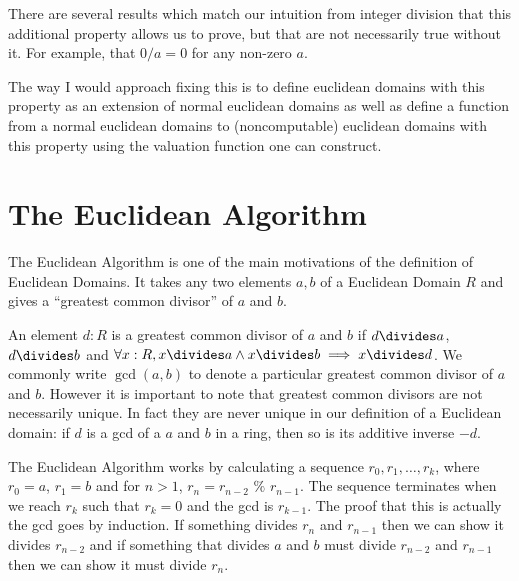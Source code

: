 \documentclass{article}
\begin{document}
There are several results which match our intuition from integer division that this additional property allows us to prove, but that are not necessarily true without it.
For example, that $0/a=0$ for any non-zero $a$.

The way I would approach fixing this is to define euclidean domains with this property as an extension of normal euclidean domains as well as define a function from a normal euclidean domains to (noncomputable) euclidean domains with this property using the valuation function one can construct.



\section{The Euclidean Algorithm}

The Euclidean Algorithm is one of the main motivations of the definition of Euclidean Domains. 
It takes any two elements $a,b$ of a Euclidean Domain $R$ and gives a ``greatest common divisor'' of $a$ and $b$. 

An element $d : R$ is a greatest common divisor of $a$ and $b$ if $d \divides a$, $d \divides b$ and $\forall x : R, x \divides a \land x \divides b \implies x \divides d$.
We commonly write $\gcd(a,b)$ to denote a particular greatest common divisor of $a$ and $b$.
However it is important to note that greatest common divisors are not necessarily unique. In fact they are never unique in our definition of a Euclidean domain: if $d$ is a gcd of a $a$ and $b$ in a ring, then so is its additive inverse $-d$.

The Euclidean Algorithm works by calculating a sequence $r_0,r_1,\ldots,r_k$, where $r_0=a$, $r_1=b$ and for $n>1$, $r_n=r_{n-2}$ $\%$ $r_{n-1}$.
The sequence terminates when we reach $r_k$ such that $r_k=0$ and the gcd is $r_{k-1}$.
The proof that this is actually the gcd goes by induction. 
If something divides $r_n$ and $r_{n-1}$ then we can show it divides $r_{n-2}$ and if something that divides $a$ and $b$ must divide $r_{n-2}$ and $r_{n-1}$ then we can show it must divide $r_n$.
\end{document}
